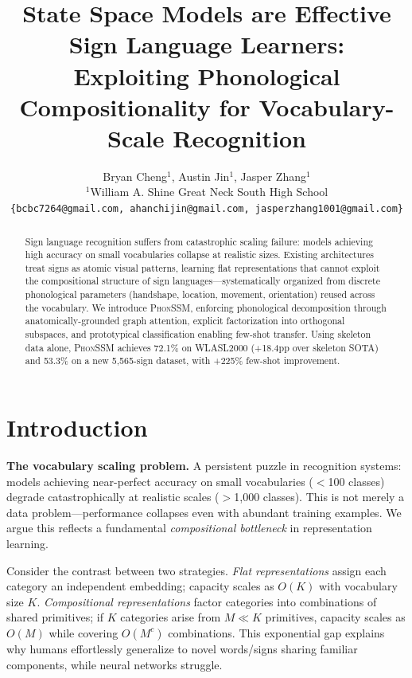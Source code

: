 \documentclass{article}
\title{State Space Models are Effective Sign Language Learners:\\Exploiting Phonological Compositionality for Vocabulary-Scale Recognition}
\author{Bryan Cheng$^{1}$, Austin Jin$^{1}$, Jasper Zhang$^{1}$ \\
$^{1}$William A. Shine Great Neck South High School \\
\texttt{\{bcbc7264@gmail.com, ahanchijin@gmail.com, jasperzhang1001@gmail.com\}} \\
}
\newcommand{\phonssm}{\textsc{PhonSSM}}
\begin{document}
\maketitle
\thispagestyle{fancy}
\fancyhf{}
\cfoot{\thepage}
\pagestyle{fancy}
\fancyhead{}
\fancyfoot{}
\fancyfoot[C]{\thepage}

\begin{abstract}
Sign language recognition suffers from catastrophic scaling failure: models achieving high accuracy on small vocabularies collapse at realistic sizes. Existing architectures treat signs as atomic visual patterns, learning flat representations that cannot exploit the compositional structure of sign languages---systematically organized from discrete phonological parameters (handshape, location, movement, orientation) reused across the vocabulary. We introduce \phonssm{}, enforcing phonological decomposition through anatomically-grounded graph attention, explicit factorization into orthogonal subspaces, and prototypical classification enabling few-shot transfer. Using skeleton data alone, \phonssm{} achieves 72.1\% on WLASL2000 (+18.4pp over skeleton SOTA) and 53.3\% on a new 5,565-sign dataset, with +225\% few-shot improvement.
\end{abstract}

\section{Introduction}

\textbf{The vocabulary scaling problem.} A persistent puzzle in recognition systems: models achieving near-perfect accuracy on small vocabularies ($<$100 classes) degrade catastrophically at realistic scales ($>$1,000 classes). This is not merely a data problem---performance collapses even with abundant training examples. We argue this reflects a fundamental \textit{compositional bottleneck} in representation learning.

Consider the contrast between two strategies. \textit{Flat representations} assign each category an independent embedding; capacity scales as $O(K)$ with vocabulary size $K$. \textit{Compositional representations} factor categories into combinations of shared primitives; if $K$ categories arise from $M \ll K$ primitives, capacity scales as $O(M)$ while covering $O(M^c)$ combinations. This exponential gap explains why humans effortlessly generalize to novel words/signs sharing familiar components, while neural networks struggle.
\end{document}

